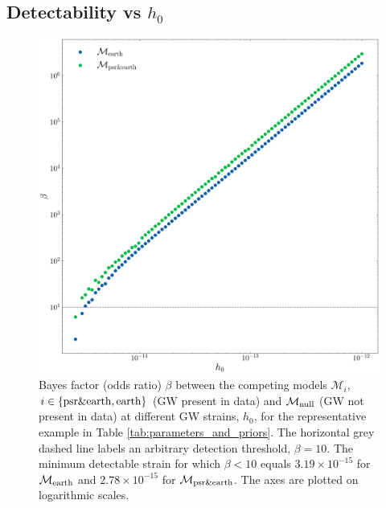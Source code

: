 \documentclass[fleqn,usenatbib,useAMS]{mnras}
\begin{document}
\subsection{Detectability vs $h_0$}\label{sec:psr_v_earth_bayes}
		\begin{figure}
			\includegraphics[width=\columnwidth, height = \columnwidth ]{images/CanonicalBayesPlot2000} 	
			\caption{Bayes factor (odds ratio) $\beta$ between the competing models $\mathcal{M}_i$, $i \in \left \{ \rm psr \& earth, earth \right \}$ (GW present in data) and $\mathcal{M}_{\rm null}$ (GW not present in data) at different GW strains, $h_0$, for the representative example in Table \ref{tab:parameters_and_priors}. The horizontal grey dashed line labels an arbitrary detection threshold, $\beta = 10$. The minimum detectable strain for which $\beta < 10$ equals $3.19 \times 10^{-15}$ for $\mathcal{M}_{\rm earth}$ and $2.78 \times 10^{-15}$ for $\mathcal{M}_{\rm psr \& earth}$. The axes are plotted on logarithmic scales.}
			\label{fig:bayes1}
		\end{figure}
	
\end{document}
